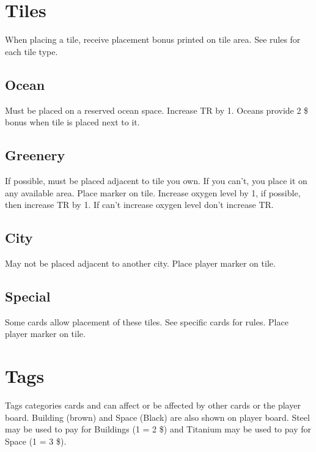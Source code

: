 \documentclass[12pt]{article}
\begin{document}
\begin{multicols*}{2}
\section*{Tiles}
When placing a tile, receive placement bonus printed on tile area. See rules for each tile type.
\subsection*{Ocean}
Must be placed on a reserved ocean space. Increase TR by 1. Oceans provide 2 \$ bonus when tile is placed next to it.

\subsection*{Greenery}
If possible, must be placed adjacent to tile you own. If you can't, you place it on any available area. Place marker on tile. Increase oxygen level by 1, if possible, then increase TR by 1. If can't increase oxygen level don't increase TR.

\subsection*{City}
May not be placed adjacent to another city. Place player marker on tile.

\subsection*{Special}
Some cards allow placement of these tiles. See specific cards for rules. Place player marker on tile.

\section*{Tags}
Tags categories cards and can affect or be affected by other cards or the player board. Building (brown) and Space (Black) are also shown on player board. Steel may be used to pay for Buildings (1 = 2 \$) and Titanium may be used to pay for Space (1 = 3 \$).

\end{multicols*}
\end{document}
